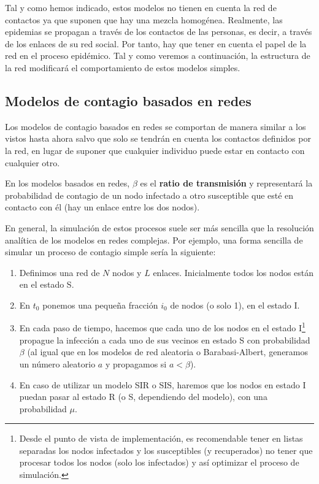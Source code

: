 \documentclass[]{article}
\begin{document}
Tal y como hemos indicado, estos modelos no tienen en cuenta la red de
contactos ya que suponen que hay una mezcla homogénea. Realmente, las
epidemias se propagan a través de los contactos de las personas, es
decir, a través de los enlaces de su red social. Por tanto, hay que
tener en cuenta el papel de la red en el proceso epidémico. Tal y como
veremos a continuación, la estructura de la red modificará el
comportamiento de estos modelos simples.

\subsection{Modelos de contagio basados en
redes}\label{modelos-de-contagio-basados-en-redes}

Los modelos de contagio basados en redes se comportan de manera similar
a los vistos hasta ahora salvo que solo se tendrán en cuenta los
contactos definidos por la red, en lugar de suponer que cualquier
individuo puede estar en contacto con cualquier otro.

En los modelos basados en redes, \(\beta\) es el \textbf{ratio de
transmisión} y representará la probabilidad de contagio de un nodo
infectado a otro susceptible que esté en contacto con él (hay un enlace
entre los dos nodos).

En general, la simulación de estos procesos suele ser más sencilla que
la resolución analítica de los modelos en redes complejas. Por ejemplo,
una forma sencilla de simular un proceso de contagio simple sería la
siguiente:

\begin{enumerate}
\def\labelenumi{\arabic{enumi}.}
\itemsep1pt\parskip0pt
\item
  Definimos una red de \(N\) nodos y \(L\) enlaces. Inicialmente todos
  los nodos están en el estado S.
\item
  En \(t_0\) ponemos una pequeña fracción \(i_0\) de nodos (o solo 1),
  en el estado I.
\item
  En cada paso de tiempo, hacemos que cada uno de los nodos en el estado
  I\footnote{Desde el punto de vista de implementación, es recomendable
    tener en listas separadas los nodos infectados y los susceptibles (y
    recuperados) no tener que procesar todos los nodos (solo los
    infectados) y así optimizar el proceso de simulación.} propague la
  infección a cada uno de sus vecinos en estado S con probabilidad
  \(\beta\) (al igual que en los modelos de red aleatoria o
  Barabasi-Albert, generamos un número aleatorio \(a\) y propagamos si
  \(a<\beta\)).
\item
  En caso de utilizar un modelo SIR o SIS, haremos que los nodos en
  estado I puedan pasar al estado R (o S, dependiendo del modelo), con
  una probabilidad \(\mu\).
\end{enumerate}
\end{document}
